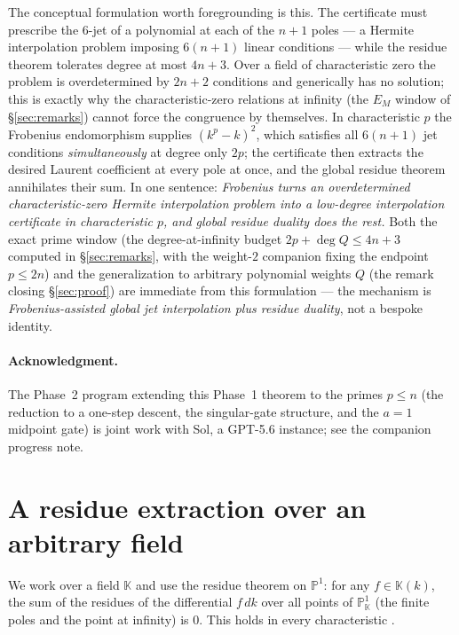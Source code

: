 \documentclass[11pt]{article}
\theoremstyle{definition}
\begin{document}
The conceptual formulation worth foregrounding is this. The certificate must
prescribe the $6$-jet of a polynomial at each of the $n+1$ poles --- a Hermite
interpolation problem imposing $6(n+1)$ linear conditions --- while the residue
theorem tolerates degree at most $4n+3$. Over a field of characteristic zero
the problem is overdetermined by $2n+2$ conditions and generically has no
solution; this is exactly why the characteristic-zero relations at infinity
(the $E_M$ window of \S\ref{sec:remarks}) cannot force the congruence by
themselves. In characteristic $p$ the Frobenius endomorphism supplies
$(k^p-k)^2$, which satisfies all $6(n+1)$ jet conditions \emph{simultaneously}
at degree only $2p$; the certificate then extracts the desired Laurent
coefficient at every pole at once, and the global residue theorem annihilates
their sum. In one sentence: \emph{Frobenius turns an overdetermined
characteristic-zero Hermite interpolation problem into a low-degree
interpolation certificate in characteristic $p$, and global residue duality
does the rest.} Both the exact prime window (the degree-at-infinity budget
$2p+\deg Q\le 4n+3$ computed in \S\ref{sec:remarks}, with the weight-$2$
companion fixing the endpoint $p\le 2n$) and the generalization to arbitrary
polynomial weights $Q$ (the remark closing \S\ref{sec:proof}) are immediate
from this formulation --- the mechanism is \emph{Frobenius-assisted global jet
interpolation plus residue duality}, not a bespoke identity.

\paragraph{Acknowledgment.} The Phase~2 program extending this Phase~1 theorem
to the primes $p \le n$ (the reduction to a one-step descent, the singular-gate
structure, and the $a=1$ midpoint gate) is joint work with Sol, a GPT-5.6
instance; see the companion progress note.

\section{A residue extraction over an arbitrary field}\label{sec:extract}

We work over a field $\mathbb K$ and use the residue theorem on $\mathbb P^1$:
for any $f\in\mathbb K(k)$, the sum of the residues of the differential $f\,dk$
over all points of $\mathbb P^1_{\mathbb K}$ (the finite poles and the point at
infinity) is $0$. This holds in every characteristic \cite[\S II]{Serre}.
\end{document}
